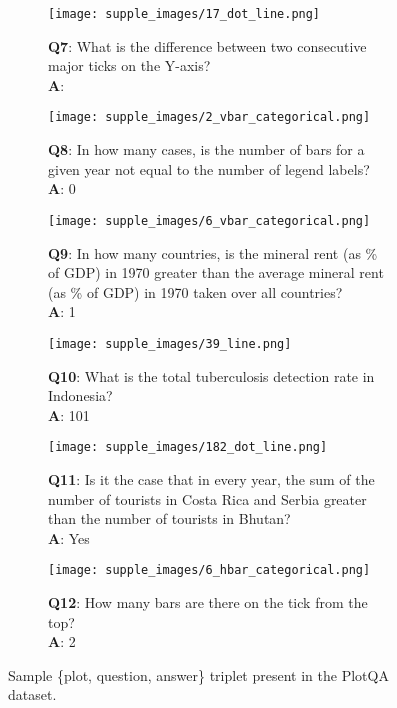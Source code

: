 \documentclass[10pt,twocolumn,letterpaper]{article}
\begin{document}
\begin{figure*}
\centering
\begin{subfigure}{.45\textwidth}
\centering
\texttt{[image: supple\_images/17\_dot\_line.png]}
\caption*{
\textbf{Q7}: What is the difference between two consecutive major ticks on the Y-axis?\\
\textbf{A}: 
}
\end{subfigure}
\hspace{0.5cm}
\begin{subfigure}{.45\textwidth}
\centering
\texttt{[image: supple\_images/2\_vbar\_categorical.png]}
\caption*{\textbf{Q8}: In how many cases, is the number of bars for a given year not equal to the number of legend labels?\\
\textbf{A}: 0
}
\end{subfigure}
\begin{subfigure}{.45\textwidth}
\centering
\texttt{[image: supple\_images/6\_vbar\_categorical.png]}
\caption*{\textbf{Q9}: In how many countries, is the mineral rent (as \% of GDP) in 1970 greater than the average mineral rent (as \% of GDP) in 1970 taken over all countries?\\
\textbf{A}: 1
}
\end{subfigure}
\hspace{0.5cm}
\begin{subfigure}{.45\textwidth}
\centering
\texttt{[image: supple\_images/39\_line.png]}
\caption*{\textbf{Q10}: What is the total tuberculosis detection rate in Indonesia?\\
\textbf{A}: 101
}
\end{subfigure}
\begin{subfigure}{.45\textwidth}
\centering
\texttt{[image: supple\_images/182\_dot\_line.png]}
\caption*{\textbf{Q11}: Is it the case that in every year, the sum of the number of tourists in Costa Rica and Serbia greater than the number of tourists in Bhutan?\\
\textbf{A}: Yes
}
\end{subfigure}
\hspace{0.5cm}
\begin{subfigure}{.45\textwidth}
\centering
\texttt{[image: supple\_images/6\_hbar\_categorical.png]}
\caption*{\textbf{Q12}: How many bars are there on the  tick from the top?\\
\textbf{A}: 2
}
\end{subfigure}
\caption{Sample \{plot, question, answer\} triplet present in the PlotQA dataset.}
\label{fig:supple_dataset_examples}
\end{figure*}
\end{document}
